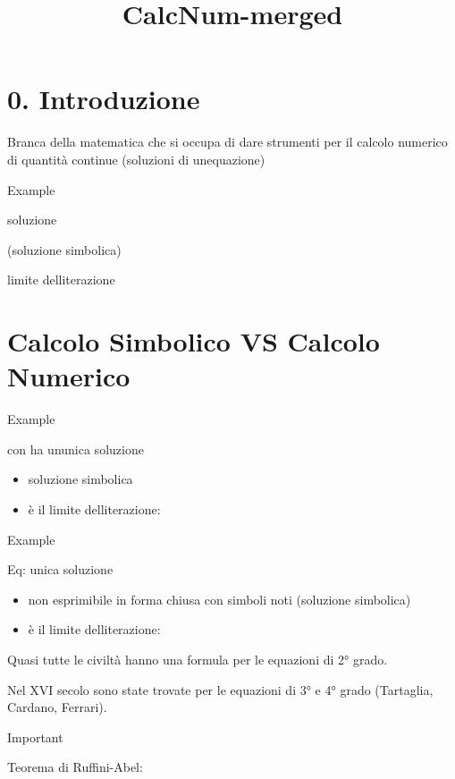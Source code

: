 \documentclass[
]{article}
\title{CalcNum-merged}
\author{}
\date{}
\providecommand{\tightlist}{%
  \setlength{\itemsep}{0pt}\setlength{\parskip}{0pt}}
\begin{document}
\maketitle

\hypertarget{introduzione}{%
\section{0. Introduzione}\label{introduzione}}

Branca della matematica che si occupa di dare strumenti per il calcolo
numerico di quantità continue (soluzioni di
un\textquotesingle equazione)

Example

{} soluzione {}

{} (soluzione simbolica)

{} limite dell\textquotesingle iterazione

{}

\hypertarget{calcolo-simbolico-vs-calcolo-numerico}{%
\section{Calcolo Simbolico VS Calcolo
Numerico}\label{calcolo-simbolico-vs-calcolo-numerico}}

Example

{} con {} ha un\textquotesingle unica soluzione {}

\begin{itemize}
\tightlist
\item
  {} soluzione simbolica
\item
  {} è il limite dell\textquotesingle iterazione:{}
\end{itemize}

Example

Eq: {} unica soluzione {}

\begin{itemize}
\tightlist
\item
  {} non esprimibile in forma chiusa con simboli noti (soluzione
  simbolica)
\item
  {} è il limite dell\textquotesingle iterazione:{}
\end{itemize}

Quasi tutte le civiltà hanno una formula per le equazioni di 2° grado.

Nel XVI secolo sono state trovate per le equazioni di 3° e 4° grado
(Tartaglia, Cardano, Ferrari).

Important

Teorema di Ruffini-Abel:
\end{document}
